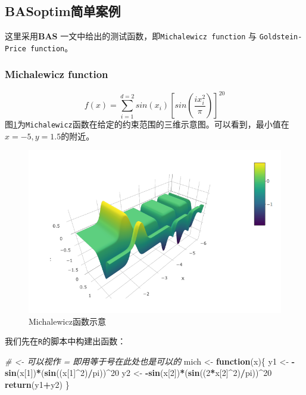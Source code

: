 \documentclass[]{ctexbook}
\newenvironment{Shaded}{\begin{snugshade}}{\end{snugshade}}
\newcommand{\KeywordTok}[1]{\textcolor[rgb]{0.13,0.29,0.53}{\textbf{#1}}}
\newcommand{\DecValTok}[1]{\textcolor[rgb]{0.00,0.00,0.81}{#1}}
\newcommand{\StringTok}[1]{\textcolor[rgb]{0.31,0.60,0.02}{#1}}
\newcommand{\CommentTok}[1]{\textcolor[rgb]{0.56,0.35,0.01}{\textit{#1}}}
\newcommand{\ControlFlowTok}[1]{\textcolor[rgb]{0.13,0.29,0.53}{\textbf{#1}}}
\newcommand{\OperatorTok}[1]{\textcolor[rgb]{0.81,0.36,0.00}{\textbf{#1}}}
\newcommand{\NormalTok}[1]{#1}
\theoremstyle{definition}
\theoremstyle{definition}
\theoremstyle{definition}
\theoremstyle{remark}
\begin{document}
\subsection{BASoptim简单案例}\label{BASexamples}

这里采用\textbf{BAS}
\citep{Jiang2017BAS}一文中给出的测试函数，即\texttt{Michalewicz\ function}
与 \texttt{Goldstein-Price\ function}。

\subsubsection{Michalewicz function}\label{BASmich}

\[
f(x)=\sum_{i=1}^{d=2}sin(x_i)[sin(\frac{ix_i^2}{\pi})]^{20}
\]
图\ref{fig:mich}为\texttt{Michalewicz}函数在给定的约束范围的三维示意图。可以看到，最小值在\(x = -5,y = 1.5\)的附近。

\begin{figure}

{\centering \includegraphics[width=0.8\linewidth]{img/mich} 

}

\caption{ Michalewicz函数示意}\label{fig:mich}
\end{figure}

我们先在\texttt{R}的脚本中构建出函数：

\begin{Shaded}
\begin{Highlighting}[]
\CommentTok{# <- 可以视作 = 即用等于号在此处也是可以的 }
\NormalTok{mich <-}\StringTok{ }\ControlFlowTok{function}\NormalTok{(x)\{}
\NormalTok{  y1 <-}\StringTok{ }\OperatorTok{-}\KeywordTok{sin}\NormalTok{(x[}\DecValTok{1}\NormalTok{])}\OperatorTok{*}\NormalTok{(}\KeywordTok{sin}\NormalTok{((x[}\DecValTok{1}\NormalTok{]}\OperatorTok{^}\DecValTok{2}\NormalTok{)}\OperatorTok{/}\NormalTok{pi))}\OperatorTok{^}\DecValTok{20}
\NormalTok{  y2 <-}\StringTok{ }\OperatorTok{-}\KeywordTok{sin}\NormalTok{(x[}\DecValTok{2}\NormalTok{])}\OperatorTok{*}\NormalTok{(}\KeywordTok{sin}\NormalTok{((}\DecValTok{2}\OperatorTok{*}\NormalTok{x[}\DecValTok{2}\NormalTok{]}\OperatorTok{^}\DecValTok{2}\NormalTok{)}\OperatorTok{/}\NormalTok{pi))}\OperatorTok{^}\DecValTok{20}
  \KeywordTok{return}\NormalTok{(y1}\OperatorTok{+}\NormalTok{y2)}
\NormalTok{\}}
\end{Highlighting}
\end{Shaded}
\end{document}
